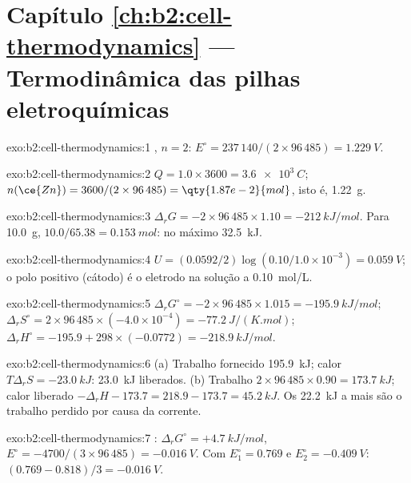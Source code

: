 \section*{Capítulo \ref{ch:b2:cell-thermodynamics} --- Termodinâmica das pilhas eletroquímicas}

\begin{solution}{exo:b2:cell-thermodynamics:1}
, $n = 2$: $E^\circ = 237\,140/(2 \times 96\,485) =
\qty{1.229}{V}$.
\end{solution}

\begin{solution}{exo:b2:cell-thermodynamics:2}
$Q = 1.0 \times 3600 = \qty{3.6e3}{C}$; $n(\ce{Zn}) = 3600/(2 \times 96\,485) =
\qty{1.87e-2}{mol}$, isto é, \qty{1.22}{g}.
\end{solution}

\begin{solution}{exo:b2:cell-thermodynamics:3}
$\Delta_r G = -2 \times 96\,485 \times 1.10 = \qty{-212}{kJ/mol}$. Para
\qty{10.0}{g}, $10.0/65.38 = \qty{0.153}{mol}$: no máximo \qty{32.5}{kJ}.
\end{solution}

\begin{solution}{exo:b2:cell-thermodynamics:4}
$U = (0.0592/2)\log(0.10/1.0 \times 10^{-3}) = \qty{0.059}{V}$; o polo positivo
(cátodo) é o eletrodo na solução a \qty{0.10}{mol/L}.
\end{solution}

\begin{solution}{exo:b2:cell-thermodynamics:5}
$\Delta_r G^\circ = -2 \times 96\,485 \times 1.015 = \qty{-195.9}{kJ/mol}$;
$\Delta_r S^\circ = 2 \times 96\,485 \times (-4.0 \times 10^{-4}) =
\qty{-77.2}{J/(K.mol)}$; $\Delta_r H^\circ = -195.9 + 298 \times (-0.0772) =
\qty{-218.9}{kJ/mol}$.
\end{solution}

\begin{solution}{exo:b2:cell-thermodynamics:6}
(a) Trabalho fornecido \qty{195.9}{kJ}; calor $T\Delta_r S = \qty{-23.0}{kJ}$: \qty{23.0}{kJ}
liberados. (b) Trabalho $2 \times 96\,485 \times 0.90 = \qty{173.7}{kJ}$; calor liberado
$-\Delta_r H - 173.7 = 218.9 - 173.7 = \qty{45.2}{kJ}$. Os
\qty{22.2}{kJ} a mais são o trabalho perdido por causa da corrente.
\end{solution}

\begin{solution}{exo:b2:cell-thermodynamics:7}
: $\Delta_r G^\circ = +\qty{4.7}{kJ/mol}$, $E^\circ =
-4700/(3 \times 96\,485) = \qty{-0.016}{V}$. Com $E_1^\circ = 0.769$ e
$E_2^\circ = \qty{-0.409}{V}$: $(0.769 - 0.818)/3 = \qty{-0.016}{V}$.
\end{solution}

